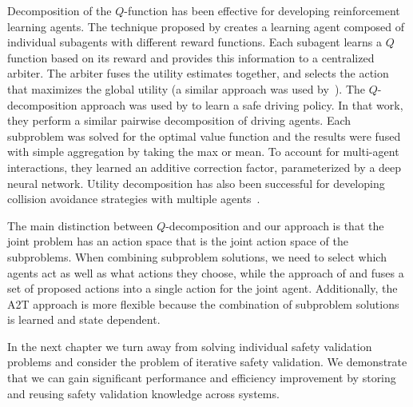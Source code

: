 Decomposition of the $Q$-function has been effective for developing reinforcement learning agents. The technique proposed by \cite{sutton2000policy} creates a learning agent composed of individual subagents with different reward functions. Each subagent learns a $Q$ function based on its reward and provides this information to a centralized arbiter. The arbiter fuses the utility estimates together, and selects the action that maximizes the global utility (a similar approach was used by~\cite{rosenblatt2000optimal}). The $Q$-decomposition approach was used by \textcite{bouton2019decomposition} to learn a safe driving policy. In that work, they perform a similar pairwise decomposition of driving agents. Each subproblem was solved for the optimal value function and the results were fused with simple aggregation by taking the max or mean. To account for multi-agent interactions, they learned an additive correction factor, parameterized by a deep neural network. Utility decomposition has also been successful for developing collision avoidance strategies with multiple agents~\cite{chryssanthacopoulos2012decomposition}.

The main distinction between $Q$-decomposition and our approach is that the joint problem has an action space that is the joint action space of the subproblems. When combining subproblem solutions, we need to select which agents act as well as what actions they choose, while the approach of \textcite{sutton2000policy} and \textcite{bouton2019reinforcement} fuses a set of proposed actions into a single action for the joint agent. Additionally, the A2T approach is more flexible because the combination of subproblem solutions is learned and state dependent. 

In the next chapter we turn away from solving individual safety validation problems and consider the problem of iterative safety validation. We demonstrate that we can gain significant performance and efficiency improvement by storing and reusing safety validation knowledge across systems. 